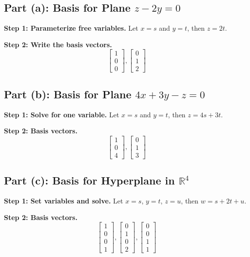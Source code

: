 \documentclass[12pt]{article}
\begin{document}
\subsection*{Part (a): Basis for Plane \(z - 2y = 0\)}
\textbf{Step 1: Parameterize free variables.}
Let \(x = s\) and \(y = t\), then \(z = 2t\).

\textbf{Step 2: Write the basis vectors.}
\[
\begin{bmatrix} 1 \\ 0 \\ 0 \end{bmatrix}, \begin{bmatrix} 0 \\ 1 \\ 2 \end{bmatrix}
\]

\subsection*{Part (b): Basis for Plane \(4x + 3y - z = 0\)}
\textbf{Step 1: Solve for one variable.}
Let \(x = s\) and \(y = t\), then \(z = 4s + 3t\).

\textbf{Step 2: Basis vectors.}
\[
\begin{bmatrix} 1 \\ 0 \\ 4 \end{bmatrix}, \begin{bmatrix} 0 \\ 1 \\ 3 \end{bmatrix}
\]

\subsection*{Part (c): Basis for Hyperplane in \( \mathbb{R}^4 \)}
\textbf{Step 1: Set variables and solve.}
Let \(x = s\), \(y = t\), \(z = u\), then \(w = s + 2t + u\).

\textbf{Step 2: Basis vectors.}
\[
\begin{bmatrix} 1 \\ 0 \\ 0 \\ 1 \end{bmatrix}, \begin{bmatrix} 0 \\ 1 \\ 0 \\ 2 \end{bmatrix}, \begin{bmatrix} 0 \\ 0 \\ 1 \\ 1 \end{bmatrix}
\]
\end{document}
